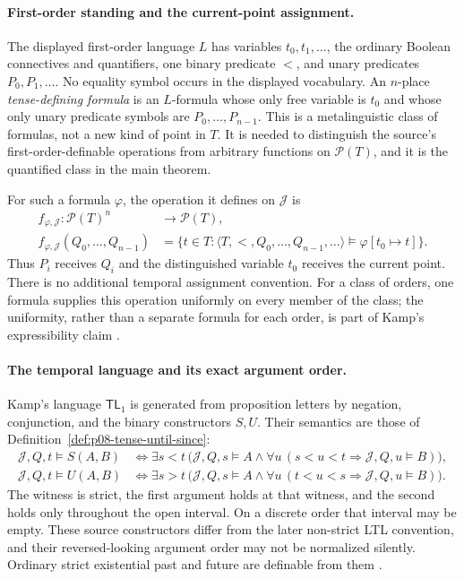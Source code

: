 \paragraph{First-order standing and the current-point assignment.}
The displayed first-order language \(L\) has variables
\(t_0,t_1,\ldots\), the ordinary Boolean connectives and quantifiers, one
binary predicate \(<\), and unary predicates \(P_0,P_1,\ldots\).  No equality
symbol occurs in the displayed vocabulary.  An \(n\)-place
\emph{tense-defining formula} is an \(L\)-formula whose only free variable is
\(t_0\) and whose only unary predicate symbols are
\(P_0,\ldots,P_{n-1}\).  This is a metalinguistic class of formulas, not a new
kind of point in \(T\).  It is needed to distinguish the source's
first-order-definable operations from arbitrary functions on
\(\mathcal P(T)\), and it is the quantified class in the main theorem.

For such a formula \(\varphi\), the operation it defines on
\(\mathcal J\) is
\[
\begin{aligned}
 f_{\varphi,\mathcal J}:
 \mathcal P(T)^n&\longrightarrow\mathcal P(T),\\
 f_{\varphi,\mathcal J}(Q_0,\ldots,Q_{n-1})
 &=
 \{t\in T:
   \langle T,<,Q_0,\ldots,Q_{n-1},\ldots\rangle
   \models\varphi[t_0\mapsto t]\}.
\end{aligned}
\]
Thus \(P_i\) receives \(Q_i\) and the distinguished variable \(t_0\) receives
the current point.  There is no additional temporal assignment convention.
For a class of orders, one formula supplies this operation uniformly on every
member of the class; the uniformity, rather than a separate formula for each
order, is part of Kamp's expressibility claim
\cite[ch.~II, defs.~2--3, pp.~21--22]{Kamp1968}.

\paragraph{The temporal language and its exact argument order.}
Kamp's language \(\mathsf{TL}_1\) is generated from proposition letters by
negation, conjunction, and the binary constructors \(S,U\).  Their semantics
are those of Definition~\ref{def:p08-tense-until-since}:
\[
\begin{aligned}
 \mathcal J,Q,t\models S(A,B)
 &\Longleftrightarrow
 \exists s<t\,
 \bigl(\mathcal J,Q,s\models A\land
       \forall u\,(s<u<t\Rightarrow\mathcal J,Q,u\models B)\bigr),\\
 \mathcal J,Q,t\models U(A,B)
 &\Longleftrightarrow
 \exists s>t\,
 \bigl(\mathcal J,Q,s\models A\land
       \forall u\,(t<u<s\Rightarrow\mathcal J,Q,u\models B)\bigr).
\end{aligned}
\]
The witness is strict, the first argument holds at that witness, and the
second holds only throughout the open interval.  On a discrete order that
interval may be empty.  These source constructors differ from the later
non-strict LTL convention, and their reversed-looking argument order may not
be normalized silently.  Ordinary strict existential past and future are
definable from them
\cite[ch.~II, pp.~25--28; ch.~III, pp.~57--58]{Kamp1968}.


